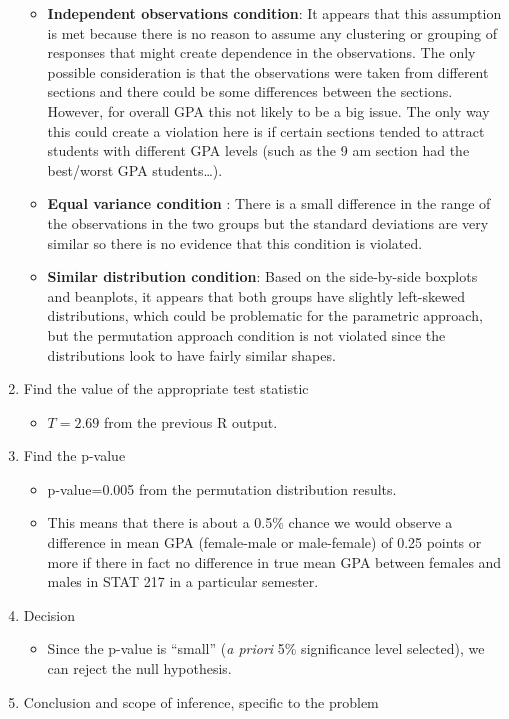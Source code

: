 \documentclass[]{book}
\providecommand{\tightlist}{%
  \setlength{\itemsep}{0pt}\setlength{\parskip}{0pt}}
\begin{document}
\begin{enumerate}
  \begin{itemize}
  \item
    \textbf{Independent observations condition}: It appears that this
    assumption is met because there is no reason to assume any
    clustering or grouping of responses that might create dependence in
    the observations. The only possible consideration is that the
    observations were taken from different sections and there could be
    some differences between the sections. However, for overall GPA this
    not likely to be a big issue. The only way this could create a
    violation here is if certain sections tended to attract students
    with different GPA levels (such as the 9 am section had the
    best/worst GPA students\ldots{}).
  \item
    \textbf{Equal variance condition} : There is a small difference in
    the range of the observations in the two groups but the standard
    deviations are very similar so there is no evidence that this
    condition is violated.
  \item
    \textbf{Similar distribution condition}: Based on the side-by-side
    boxplots and beanplots, it appears that both groups have slightly
    left-skewed distributions, which could be problematic for the
    parametric approach, but the permutation approach condition is not
    violated since the distributions look to have fairly similar shapes.
  \end{itemize}
\item
  Find the value of the appropriate test statistic

  \begin{itemize}
  \tightlist
  \item
    \(T=2.69\) from the previous R output.
  \end{itemize}
\item
  Find the p-value

  \begin{itemize}
  \item
    p-value=0.005 from the permutation distribution results.
  \item
    This means that there is about a 0.5\% chance we would observe a
    difference in mean GPA (female-male or male-female) of 0.25 points
    or more if there in fact no difference in true mean GPA between
    females and males in STAT 217 in a particular semester.
  \end{itemize}
\item
  Decision

  \begin{itemize}
  \tightlist
  \item
    Since the p-value is ``small'' (\emph{a priori} 5\% significance
    level selected), we can reject the null hypothesis.
  \end{itemize}
\item
  Conclusion and scope of inference, specific to the problem


\end{enumerate}
\end{document}
